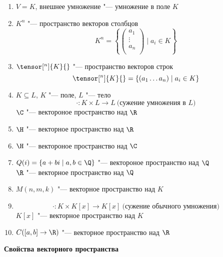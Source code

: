 \begin{exmp}
	\begin{enumerate}
	\item
		$V = K$, внешнее умножение "--- умножение в поле $K$
	\item
		$K^n$ "--- пространство векторов столбцов
		\[ K^n = \left\{
			\begin{pmatrix}
				a_1\\
				\vdots\\
				a_n\\
			\end{pmatrix}
			\mid a_i \in K
		\right\} \]
	\item
		$\tensor[^n]{K}{}$ "--- пространство векторов строк
		\[ \tensor[^n]{K}{} = \left\{
			( a_1 \dots a_n) \mid a_i \in K
		\right\} \]
	\item
		$K \subseteq L$, $K$ "--- поле, $L$ "--- тело
		\[ \cdot \colon K \times L \to L ~ \text{(сужение умножения в $L$)} \]
		$\C$ "--- вектороное пространство над $\R$
	\item
		$\H$ "--- векторное пространство над $\R$
	\item
		$\H$ "--- вектороное пространство над $\C$
	\item
		$Q(i) = \{ a + bi \mid a,b \in \Q \}$ "--- вектороное пространство над $\Q$ \\
		$\R$ "--- векторное пространство над $\Q$
	\item
		$M(n,m,k)$ "--- векторное пространство над $K$
	\item
		\[ \cdot \colon K \times K[x] \to K[x] ~ \text{(сужение обычного умножения)} \]
		$K[x]$ "--- векторное пространство над $K$
	\item
		$C([a,b] \to \R)$ "--- векторное пространство над $\R$
	\end{enumerate}
\end{exmp}

\textbf{Свойства векторного пространства}

